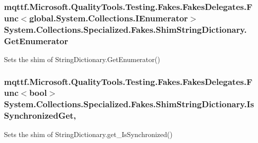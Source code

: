 \hypertarget{class_system_1_1_collections_1_1_specialized_1_1_fakes_1_1_shim_string_dictionary_a3ca6b7918a49c3d76d1e41190479f87a}{
\subsubsection[{Get\-Enumerator}]{\setlength{\rightskip}{0pt plus 5cm}mqttf.\-Microsoft.\-Quality\-Tools.\-Testing.\-Fakes.\-Fakes\-Delegates.\-Func$<$global.\-System.\-Collections.\-I\-Enumerator$>$ System.\-Collections.\-Specialized.\-Fakes.\-Shim\-String\-Dictionary.\-Get\-Enumerator\hspace{0.3cm}{\ttfamily [set]}}}\label{class_system_1_1_collections_1_1_specialized_1_1_fakes_1_1_shim_string_dictionary_a3ca6b7918a49c3d76d1e41190479f87a}


Sets the shim of String\-Dictionary.\-Get\-Enumerator()

\hypertarget{class_system_1_1_collections_1_1_specialized_1_1_fakes_1_1_shim_string_dictionary_aa7da50d01e9d13fb1cabce7cb7d5e44c}{
\subsubsection[{Is\-Synchronized\-Get}]{\setlength{\rightskip}{0pt plus 5cm}mqttf.\-Microsoft.\-Quality\-Tools.\-Testing.\-Fakes.\-Fakes\-Delegates.\-Func$<$bool$>$ System.\-Collections.\-Specialized.\-Fakes.\-Shim\-String\-Dictionary.\-Is\-Synchronized\-Get\hspace{0.3cm}{\ttfamily [get]}, {\ttfamily [set]}}}\label{class_system_1_1_collections_1_1_specialized_1_1_fakes_1_1_shim_string_dictionary_aa7da50d01e9d13fb1cabce7cb7d5e44c}


Sets the shim of String\-Dictionary.\-get\-\_\-\-Is\-Synchronized()

